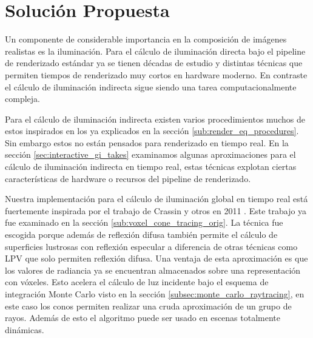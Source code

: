 \chapter{Solución Propuesta}
\label{chap:proposal}

Un componente de considerable importancia en la composición de imágenes realistas es la iluminación. Para el cálculo de iluminación directa bajo el pipeline de renderizado estándar ya se tienen décadas de estudio y distintas técnicas que permiten tiempos de renderizado muy cortos en hardware moderno. En contraste el cálculo de iluminación indirecta sigue siendo una tarea computacionalmente compleja. 

Para el cálculo de iluminación indirecta existen varios procedimientos muchos de estos inspirados en los ya explicados en la sección \ref{sub:render_eq_procedures}. Sin embargo estos no están pensados para renderizado en tiempo real. En la sección \ref{sec:interactive_gi_takes} examinamos algunas aproximaciones para el cálculo de iluminación indirecta en tiempo real, estas técnicas explotan ciertas características de hardware o recursos del pipeline de renderizado.

Nuestra implementación para el cálculo de iluminación global en tiempo real está fuertemente inspirada por el trabajo de Crassin y otros en 2011 \cite{CNSGE11b}. Este trabajo ya fue examinado en la sección \ref{sub:voxel_cone_tracing_orig}. La técnica fue escogida porque además de reflexión difusa también permite el cálculo de superficies lustrosas con reflexión especular a diferencia de otras técnicas como \ac{LPV} que solo permiten reflexión difusa. Una ventaja de esta aproximación es que los valores de radiancia ya se encuentran almacenados sobre una representación con vóxeles. Esto acelera el cálculo de luz incidente bajo el esquema de integración Monte Carlo visto en la sección \ref{subsec:monte_carlo_raytracing}, en este caso los conos permiten realizar una cruda aproximación de un grupo de rayos. Además de esto el algoritmo puede ser usado en escenas totalmente dinámicas.







